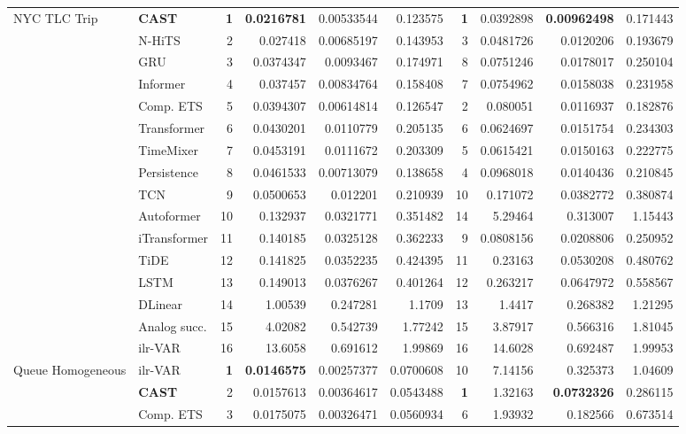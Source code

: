 \begin{longtable}{@{}llrrrrrrrr@{}}
NYC TLC Trip & \textbf{CAST} & \textbf{1} & \textbf{0.0216781} & 0.00533544 & 0.123575 & \textbf{1} & 0.0392898 & \textbf{0.00962498} & 0.171443 \\
 & N-HiTS & 2 & 0.027418 & 0.00685197 & 0.143953 & 3 & 0.0481726 & 0.0120206 & 0.193679 \\
 & GRU & 3 & 0.0374347 & 0.0093467 & 0.174971 & 8 & 0.0751246 & 0.0178017 & 0.250104 \\
 & Informer & 4 & 0.037457 & 0.00834764 & 0.158408 & 7 & 0.0754962 & 0.0158038 & 0.231958 \\
 & Comp. ETS & 5 & 0.0394307 & 0.00614814 & 0.126547 & 2 & 0.080051 & 0.0116937 & 0.182876 \\
 & Transformer & 6 & 0.0430201 & 0.0110779 & 0.205135 & 6 & 0.0624697 & 0.0151754 & 0.234303 \\
 & TimeMixer & 7 & 0.0453191 & 0.0111672 & 0.203309 & 5 & 0.0615421 & 0.0150163 & 0.222775 \\
 & Persistence & 8 & 0.0461533 & 0.00713079 & 0.138658 & 4 & 0.0968018 & 0.0140436 & 0.210845 \\
 & TCN & 9 & 0.0500653 & 0.012201 & 0.210939 & 10 & 0.171072 & 0.0382772 & 0.380874 \\
 & Autoformer & 10 & 0.132937 & 0.0321771 & 0.351482 & 14 & 5.29464 & 0.313007 & 1.15443 \\
 & iTransformer & 11 & 0.140185 & 0.0325128 & 0.362233 & 9 & 0.0808156 & 0.0208806 & 0.250952 \\
 & TiDE & 12 & 0.141825 & 0.0352235 & 0.424395 & 11 & 0.23163 & 0.0530208 & 0.480762 \\
 & LSTM & 13 & 0.149013 & 0.0376267 & 0.401264 & 12 & 0.263217 & 0.0647972 & 0.558567 \\
 & DLinear & 14 & 1.00539 & 0.247281 & 1.1709 & 13 & 1.4417 & 0.268382 & 1.21295 \\
 & Analog succ. & 15 & 4.02082 & 0.542739 & 1.77242 & 15 & 3.87917 & 0.566316 & 1.81045 \\
 & ilr-VAR & 16 & 13.6058 & 0.691612 & 1.99869 & 16 & 14.6028 & 0.692487 & 1.99953 \\
\addlinespace
Queue Homogeneous & ilr-VAR & \textbf{1} & \textbf{0.0146575} & 0.00257377 & 0.0700608 & 10 & 7.14156 & 0.325373 & 1.04609 \\
 & \textbf{CAST} & 2 & 0.0157613 & 0.00364617 & 0.0543488 & \textbf{1} & 1.32163 & \textbf{0.0732326} & 0.286115 \\
 & Comp. ETS & 3 & 0.0175075 & 0.00326471 & 0.0560934 & 6 & 1.93932 & 0.182566 & 0.673514 \\

\end{longtable}
